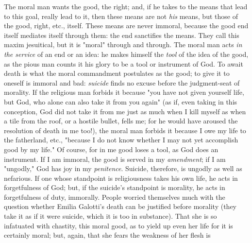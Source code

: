 The moral man wants the good, the right; and, if he takes to the means that 
lead to this goal, really lead to it, then these means are not \textit{his} 
means, but those of the good, right, etc., itself. These means are never 
immoral, because the good end itself mediates itself through them: the end 
sanctifies the means. They call this maxim jesuitical, but it is "{}moral"{} 
through and through. The moral man acts \textit{in the service} of an end or 
an idea: he makes himself the \textit{tool} of the idea of the good, as the 
pious man counts it his glory to be a tool or instrument of God. To await 
death is what the moral commandment postulates as the good; to give it to 
oneself is immoral and bad: \textit{suicide} finds no excuse before the 
judgment-seat of morality. If the religious man forbids it because "{}you have 
not given yourself life, but God, who alone can also take it from you again"{} 
(as if, even taking in this conception, God did not take it from me just as 
much when I kill myself as when a tile from the roof, or a hostile bullet, 
fells me; for he would have aroused the resolution of death in me too!), the 
moral man forbids it because I owe my life to the fatherland, etc., "{}because 
I do not know whether I may not yet accomplish good by my life."{} Of course, 
for in me good loses a tool, as God does an instrument. If I am immoral, the 
good is served in my \textit{amendment}; if I am "{}ungodly,"{} God has joy in 
my \textit{penitence}. Suicide, therefore, is ungodly as well as nefarious. If 
one whose standpoint is religiousness takes his own life, he acts in 
forgetfulness of God; but, if the suicide's standpoint is morality, he acts in 
forgetfulness of duty, immorally. People worried themselves much with the 
question whether Emilia Galotti's death can be justified before morality (they 
take it as if it were suicide, which it is too in substance). That she is so 
infatuated with chastity, this moral good, as to yield up even her life for it 
is certainly moral; but, again, that she fears the weakness of her flesh is 
